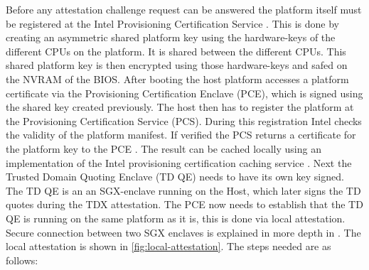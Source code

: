 \label{Pre-Attestation setup}
Before any attestation challenge request can be answered the platform itself must be registered at the Intel Provisioning Certification Service \cite{intel_corporation_dcap_2024-1}. This is done by creating an asymmetric shared platform key using the hardware-keys of the different CPUs on the platform. It is shared between the different CPUs. This shared platform key is then encrypted using those hardware-keys and safed on the NVRAM of the BIOS. After booting the host platform accesses a platform certificate via the Provisioning Certification Enclave (PCE), which is signed using the shared key created previously. The host then has to register the platform at the Provisioning Certification Service (PCS). During this registration Intel checks the validity of the platform manifest. If verified the PCS returns a certificate for the platform key to the PCE \cite{cheng_intel_2023}. The result can be cached locally using an implementation of the Intel provisioning certification caching service \cite{caching_service}. Next the Trusted Domain Quoting Enclave (TD QE) needs to have its own key signed. The TD QE is an an SGX-enclave running on the Host, which later signs the TD quotes during the TDX attestation. The PCE now needs to establish that the TD QE is running on the same platform as it is, this is done via local attestation. Secure connection between two SGX enclaves is explained in more depth in \cite{intel_corporation_migration_spec_2023}. The local attestation is shown in \cref{fig:local-attestation}. The steps needed are as follows:
\newcommand\setItemnumber[1]{\setcounter{enumi}{\numexpr#1-1\relax}}
